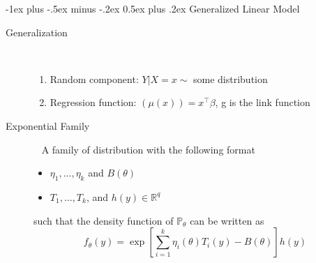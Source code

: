 \documentclass[a4paper, 10pt,landscape]{article}
\makeatletter
\renewcommand{\section}{\@startsection{section}{1}{0mm}%
                                {-1ex plus -.5ex minus -.2ex}%
                                {0.5ex plus .2ex}%
                                {\normalfont\large\bfseries}}
\makeatother
\begin{document}
\begin{multicols*}{4}
\section{Generalized Linear Model}
\begin{description}
	\item[Generalization]~
		\begin{enumerate}
			\item {Random component}: $Y|X=x\sim$ some distribution
			\item {Regression function}: $\left(\mu(x)\right)=x^\intercal\beta$, g is the link function
		\end{enumerate}

	\item[Exponential Family]~
		A family of distribution with the following format
		\begin{itemize}
			\item $\eta_1,\dots,\eta_k$ and $B(\theta)$
			\item $T_1,\dots,T_k$, and $h(y)\in\mathbb{R}^q$
		\end{itemize}
		such that the density function of $\mathbb{P}_\theta$ can be written as
		$$f_\theta(y)=\exp\left[\sum_{i=1}^{k}\eta_i(\theta)T_i(y)-B(\theta)\right]h(y)$$


\end{description}
\end{multicols*}
\end{document}
